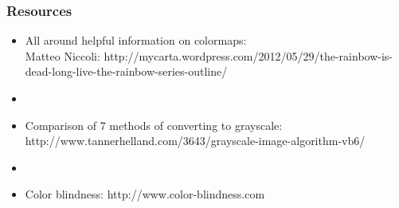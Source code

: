 \documentclass[ignorenonframetext]{beamer}
\begin{document}
\begin{frame}[c]\frametitle{Resources}
\begin{itemize}
    \item[] All around helpful information on colormaps: \\Matteo Niccoli: http://mycarta.wordpress.com/2012/05/29/the-rainbow-is-dead-long-live-the-rainbow-series-outline/
    \item[] ~
    \item[] Comparison of 7 methods of converting to grayscale: http://www.tannerhelland.com/3643/grayscale-image-algorithm-vb6/
    \item[] ~
    \item[] Color blindness: http://www.color-blindness.com
\end{itemize}
\end{frame}
\end{document}
